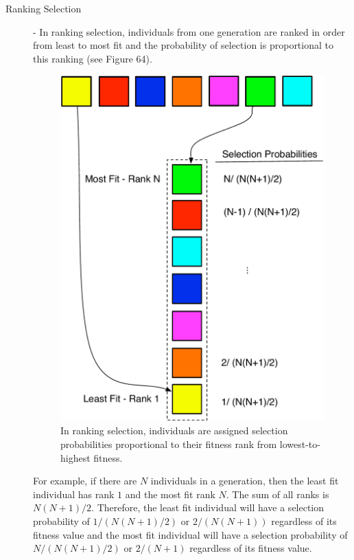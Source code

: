 \documentclass[12pt]{report} 	%
\numberwithin{figure}{chapter}
\numberwithin{table}{chapter}
\numberwithin{equation}{chapter}
\begin{document}
\begin{flushleft}
\begin{description}
\item [Ranking Selection] - In ranking selection, individuals from one generation are ranked in order from least to most fit and the probability of selection is proportional to this ranking (see Figure 64). 
\begin{figure}[h!]
\begin{center}
\includegraphics[scale = 0.6]{RankSelection}
\caption[Ranking selection]{In ranking selection, individuals are assigned selection probabilities proportional to their fitness rank from lowest-to-highest fitness.}
\end{center}
\end{figure}
For example, if there are $N$ individuals in a generation, then the least fit individual has rank $1$ and the most fit rank $N$. The sum of all ranks is $N(N+1)/2$. Therefore, the least fit individual will have a selection probability of $1/(N(N+1)/2)$ or $2/(N(N+1))$ regardless of its fitness value and the most fit individual will have a selection probability of $N/(N(N+1)/2)$ or $2/(N+1)$ regardless of its fitness value. 


\end{description}
\end{flushleft}
\end{document}
